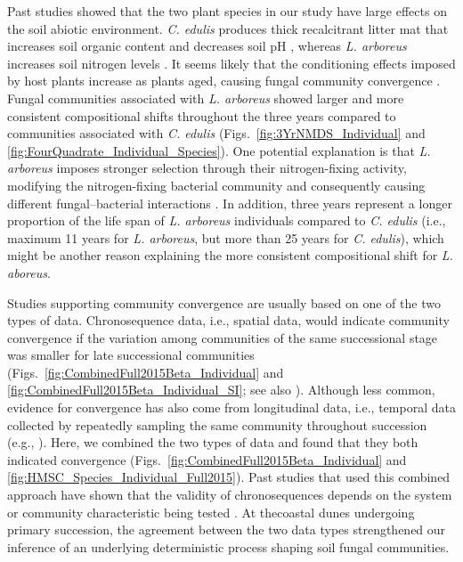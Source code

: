 Past studies showed that the two plant species in our study have large effects on the soil abiotic environment.
\textit{C. edulis} produces thick recalcitrant litter mat that increases soil organic content and decreases soil pH \citep{Novoa2013, Novoa2014}, whereas \textit{L. arboreus} increases soil nitrogen levels \citep{Maron1996, Maron2001}. 
It seems likely that the conditioning effects imposed by host plants increase as plants aged, causing fungal community convergence \citep{Dinnage2019}. 
Fungal communities associated with \textit{L. arboreus} showed larger and more consistent compositional shifts throughout the three years compared to communities associated with \textit{C. edulis} (Figs.~\ref{fig:3YrNMDS_Individual} and \ref{fig:FourQuadrate_Individual_Species}). 
One potential explanation is that \textit{L. arboreus} imposes stronger selection through their nitrogen-fixing activity, modifying the nitrogen-fixing bacterial community and consequently causing different fungal--bacterial interactions \citep{Johansson2004}.
In addition, three years represent a longer proportion of the life span of \textit{L. arboreus} individuals compared to \textit{C. edulis} (i.e., maximum 11 years for \textit{L. arboreus}, but more than 25 years for \textit{C. edulis}), which might be another reason explaining the more consistent compositional shift for \textit{L. aboreus}. 
\par


Studies supporting community convergence are usually based on one of the two types of data. Chronosequence data, i.e., spatial data, would indicate community convergence if the variation among communities of the same successional stage was smaller for late successional communities (Figs.~\ref{fig:CombinedFull2015Beta_Individual} and \ref{fig:CombinedFull2015Beta_Individual_SI}; see also \citealp{BrownJumpponen2014, Castle2016, RoyBolduc2016}).
Although less common, evidence for convergence has also come from longitudinal data, i.e., temporal data collected by repeatedly sampling the same community throughout succession (e.g., \citealp{Fukami2005, Li2016, Gao2019}).
Here, we combined the two types of data and found that they both indicated convergence (Figs.~\ref{fig:CombinedFull2015Beta_Individual} and \ref{fig:HMSC_Species_Individual_Full2015}). 
Past studies that used this combined approach have shown that the validity of chronosequences depends on the system or community characteristic being tested \citep{Foster2000, Clark2019}.
At thecoastal dunes undergoing primary succession, the agreement between the two data types strengthened our inference of an underlying deterministic process shaping soil fungal communities. 
\par


